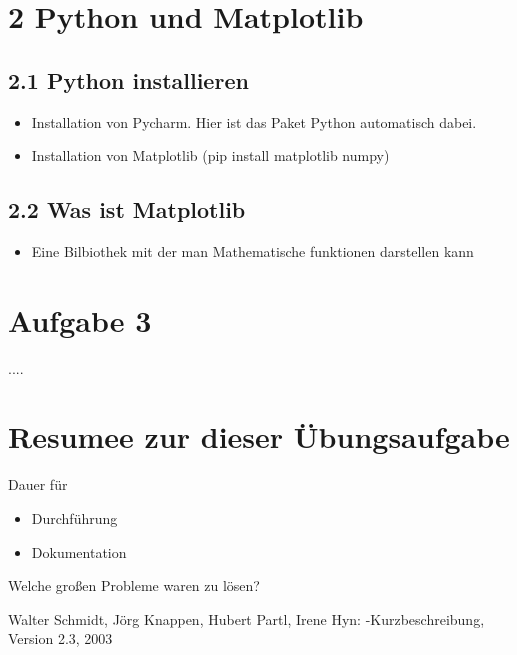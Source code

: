 \documentclass[a4paper,11pt,titlepage]{article}
\begin{document}
\section{2 Python und Matplotlib}
\subsection{2.1 Python installieren}
\begin{itemize}
  \item Installation von Pycharm. Hier ist das Paket Python automatisch dabei.
  \item Installation von Matplotlib (pip install matplotlib numpy)
\end{itemize}
\subsection{2.2 Was ist Matplotlib}
\begin{itemize}
  \item Eine Bilbiothek mit der man Mathematische funktionen darstellen kann
\end{itemize}

\section{Aufgabe 3}
....

\section{Resumee zur dieser \"Ubungsaufgabe}
Dauer f\"ur 
\begin{itemize}
	\item Durchf\"uhrung
	\item Dokumentation
\end{itemize}
Welche großen Probleme waren zu l\"osen?

\begin{thebibliography}{99}
	Walter Schmidt, J\"org Knappen, Hubert Partl, Irene Hyn: 
\LaTeXe-Kurzbeschreibung, 	Version 2.3, 2003
	

\end{thebibliography}
\end{document}
